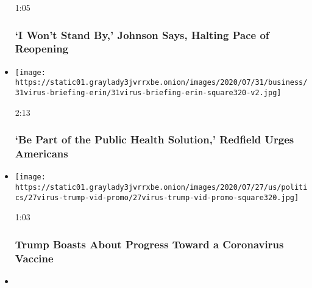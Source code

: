 \begin{itemize}
  1:05

  \hypertarget{i-wont-stand-by-johnson-says-halting-pace-of-reopening}{%
  \subsubsection{`I Won't Stand By,' Johnson Says, Halting Pace of
  Reopening}\label{i-wont-stand-by-johnson-says-halting-pace-of-reopening}}
\item
  \href{https://www.nytimes3xbfgragh.onion/video/us/politics/100000007266691/fauci-congress-testimony.html?action=click\&module=video-series-bar\&region=header\&pgtype=Article\&playlistId=video/coronavirus-news-update}{}

  \texttt{[image: https://static01.graylady3jvrrxbe.onion/images/2020/07/31/business/31virus-briefing-erin/31virus-briefing-erin-square320-v2.jpg]}

  2:13

  \hypertarget{be-part-of-the-public-health-solution-redfield-urges-americans}{%
  \subsubsection{`Be Part of the Public Health Solution,' Redfield Urges
  Americans}\label{be-part-of-the-public-health-solution-redfield-urges-americans}}
\item
  \href{https://www.nytimes3xbfgragh.onion/video/us/100000007258794/trump-boasts-vaccine-progress-north-carolina.html?action=click\&module=video-series-bar\&region=header\&pgtype=Article\&playlistId=video/coronavirus-news-update}{}

  \texttt{[image: https://static01.graylady3jvrrxbe.onion/images/2020/07/27/us/politics/27virus-trump-vid-promo/27virus-trump-vid-promo-square320.jpg]}

  1:03

  \hypertarget{trump-boasts-about-progress-toward-a-coronavirus-vaccine}{%
  \subsubsection{Trump Boasts About Progress Toward a Coronavirus
  Vaccine}\label{trump-boasts-about-progress-toward-a-coronavirus-vaccine}}
\item
  \href{https://www.nytimes3xbfgragh.onion/video/world/100000007258544/who-pandemic-response.html?action=click\&module=video-series-bar\&region=header\&pgtype=Article\&playlistId=video/coronavirus-news-update}{}


\end{itemize}
